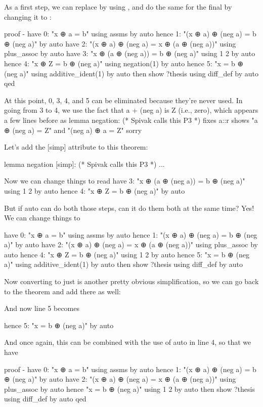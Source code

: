 As a first step, we can replace  by using , and do the same for the final  by changing it to :
\begin{IS}
    
proof -
  have 0: "x ⊕ a = b" using assms by auto
  hence 1: "(x ⊕ a) ⊕ (neg a) = b ⊕ (neg a)" by auto
  have 2: "(x ⊕ a) ⊕ (neg a) = x ⊕ (a ⊕ (neg a))" using plus_assoc by auto
  have 3: "x ⊕ (a ⊕ (neg a)) = b ⊕ (neg a)" using 1 2 by auto
  hence 4: "x ⊕ Z = b ⊕ (neg a)" using negation(1) by auto
  hence 5: "x = b ⊕ (neg a)" using additive_ident(1) by auto
  then show ?thesis using diff_def by auto
qed
\end{IS}

At this point, 0, 3, 4, and 5 can be eliminated because they're never used. In going from 3 to 4, we use the fact that a + (neg a) is Z (i.e., zero), which appears a few lines before as 
lemma  negation: (* Spivak calls this P3 *)
  fixes a::r
  shows "a ⊕ (neg a) =  Z"
  and  "(neg a) ⊕ a =  Z"
  sorry

Let's add the [simp] attribute to this theorem:

lemma  negation [simp]: (* Spivak calls this P3 *)
...

Now we can change things to read
have 3: "x ⊕ (a ⊕ (neg a)) = b ⊕ (neg a)" using 1 2 by auto
hence 4: "x ⊕ Z = b ⊕ (neg a)" by auto

But if auto can do both those steps, can it do them both at the same time? Yes! We can change things to 
\begin{IS}

  have 0: "x ⊕ a = b" using assms by auto
  hence 1: "(x ⊕ a) ⊕ (neg a) = b ⊕ (neg a)" by auto
  have 2: "(x ⊕ a) ⊕ (neg a) = x ⊕ (a ⊕ (neg a))" using plus_assoc by auto
  hence 4: "x ⊕ Z = b ⊕ (neg a)" using 1 2  by auto
  hence 5: "x = b ⊕ (neg a)" using additive_ident(1) by auto
  then show ?thesis using diff_def by auto
\end{IS}
Now converting  to just  is another pretty obvious simplification, so we can go back to the  theorem and add \isi{[simp]} there as well:

And now line 5 becomes
\begin{IS}    
hence 5: "x = b ⊕ (neg a)" by auto
\end{IS} 
And once again, this can be combined with the use of auto in line 4, so that we have
\begin{IS}
proof -
  have 0: "x ⊕ a = b" using assms by auto
  hence 1: "(x ⊕ a) ⊕ (neg a) = b ⊕ (neg a)" by auto
  have 2: "(x ⊕ a) ⊕ (neg a) = x ⊕ (a ⊕ (neg a))" using plus_assoc by auto
  hence "x = b ⊕ (neg a)" using 1 2 by auto
  then show ?thesis using diff_def by auto
qed
\end{IS} 

